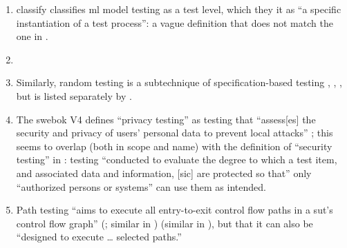 \begin{enumerate}
    \item %
           \citetISTQB{} \ifnotpaper classify \else classifies \fi
          \acs{ml} model testing as a test level, which \ifnotpaper they \else
              it \fi {} as ``a specific instantiation of a
          test process'': a vague definition that does not match the one in
          .
    \item %
          \perfSecParFlaw{}
    \item %
          Similarly, random testing is a subtechnique of specification-based
          testing \ifnotpaper
              \citetext{\citealp[pp.~7, 22]{IEEE2022};
                  \citeyear[pp.~5, 20, Fig.~2]{IEEE2021};
                  \citealp[p.~5\=/12]{SWEBOK2024}; \citealpISTQB{}} \else
              \cite[pp.~7, 22]{IEEE2022}, \cite{ISTQB},
              \cite[p.~5\=/12]{SWEBOK2024}, \cite[pp.~5, 20, Fig.~2]{IEEE2021}
          \fi but is listed
          separately by \citet[p.~46]{Firesmith2015}.
    \item %
          The \acs{swebok} V4 defines ``privacy testing'' as testing that
          ``assess[es] the security and privacy of users' personal data to
          prevent local attacks'' \citep[p.~5-10]{SWEBOK2024}; this seems to
          overlap (both in scope and name) with the definition of ``security
          testing'' in \citep[p.~7]{IEEE2022}: testing
          ``conducted to evaluate the degree to which a test item, and
          associated data and information, [sic] are protected so that'' only
          ``authorized persons or systems'' can use them as intended.
    \item %
          Path testing ``aims to execute all entry-to-exit control flow paths
          in a \acs{sut}'s control flow graph'' \ifnotpaper
              (\citealp[p.~5-13]{SWEBOK2024}; similar in
              \citealp[p.~119]{Patton2006})\else \cite[p.~5-13]{SWEBOK2024}
              (similar in \cite[p.~119]{Patton2006})\fi, but
          \citet[p.~316]{IEEE2017}  that it can also be
          ``designed to execute \dots{} selected paths.''

\end{enumerate}
